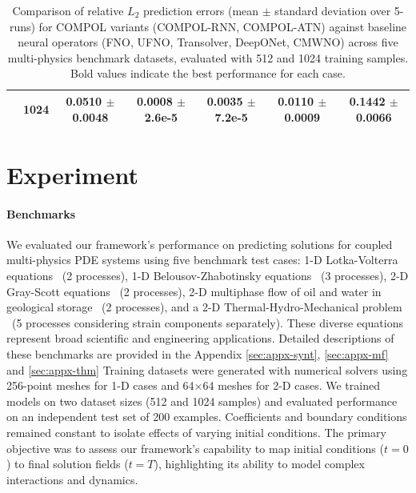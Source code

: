 \begin{table}[!htbp]
{\begin{tabular}{@{}lcccccc@{}}
			& 1024 & \textbf{0.0510 $\pm$0.0048} & \textbf{0.0008 $\pm$2.6e-5} & \textbf{0.0035 $\pm$7.2e-5} & \textbf{0.0110 $\pm$0.0009} & 0.1442 $\pm$0.0066 \\
			\hline
	\end{tabular}}
	\vspace{1em}
	\caption{\small Comparison of relative $L_2$ prediction errors (mean $\pm$ standard deviation over 5-runs) for COMPOL variants (COMPOL-RNN, COMPOL-ATN) against baseline neural operators (FNO, UFNO, Transolver, DeepONet, CMWNO) across five multi-physics benchmark datasets, evaluated with 512 and 1024 training samples. Bold values indicate the best performance for each case.}
	\label{tab:nrmse}
\end{table}

\section{Experiment}
\paragraph{Benchmarks} We evaluated our framework’s performance on predicting solutions for coupled multi-physics PDE systems using five benchmark test cases: 1-D Lotka-Volterra equations~\citep{murray2007mathematical} (2 processes), 1-D Belousov-Zhabotinsky equations~\citep{petrov1993controlling} (3 processes), 2-D Gray-Scott equations~\citep{pearson1993complex} (2 processes), 2-D multiphase flow of oil and water in geological storage~\citep{bear2010modeling,hashemi2021pore,abou2013petroleum} (2 processes), and a 2-D Thermal-Hydro-Mechanical problem ~\cite{gao2020three}(5 processes considering strain components separately). These diverse equations represent broad scientific and engineering applications. Detailed descriptions of these benchmarks are provided in the Appendix \ref{sec:appx-synt}, \ref{sec:appx-mf} and \ref{sec:appx-thm} Training datasets were generated with numerical solvers using 256-point meshes for 1-D cases and 64×64 meshes for 2-D cases. We trained models on two dataset sizes (512 and 1024 samples) and evaluated performance on an independent test set of 200 examples. Coefficients and boundary conditions remained constant to isolate effects of varying initial conditions. The primary objective was to assess our framework’s capability to map initial conditions ($t=0$) to final solution fields ($t=T$), highlighting its ability to model complex interactions and dynamics.
